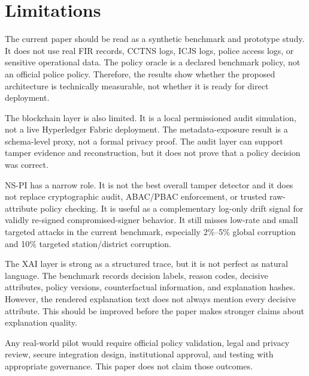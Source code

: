 \section{Limitations}
\label{sec:limitations}

The current paper should be read as a synthetic benchmark and prototype study.
It does not use real FIR records, CCTNS logs, ICJS logs, police access logs, or
sensitive operational data. The policy oracle is a declared benchmark policy,
not an official police policy. Therefore, the results show whether the proposed
architecture is technically measurable, not whether it is ready for direct
deployment.

The blockchain layer is also limited. It is a local permissioned audit
simulation, not a live Hyperledger Fabric deployment. The metadata-exposure
result is a schema-level proxy, not a formal privacy proof. The audit layer can
support tamper evidence and reconstruction, but it does not prove that a policy
decision was correct.

NS-PI has a narrow role. It is not the best overall tamper detector and it does
not replace cryptographic audit, ABAC/PBAC enforcement, or trusted
raw-attribute policy checking. It is useful as a complementary log-only drift
signal for validly re-signed compromised-signer behavior. It still misses
low-rate and small targeted attacks in the current benchmark, especially
2\%--5\% global corruption and 10\% targeted station/district corruption.

The XAI layer is strong as a structured trace, but it is not perfect as natural
language. The benchmark records decision labels, reason codes, decisive
attributes, policy versions, counterfactual information, and explanation
hashes. However, the rendered explanation text does not always mention every
decisive attribute. This should be improved before the paper makes stronger
claims about explanation quality.

Any real-world pilot would require official policy validation, legal and
privacy review, secure integration design, institutional approval, and testing
with appropriate governance. This paper does not claim those outcomes.
